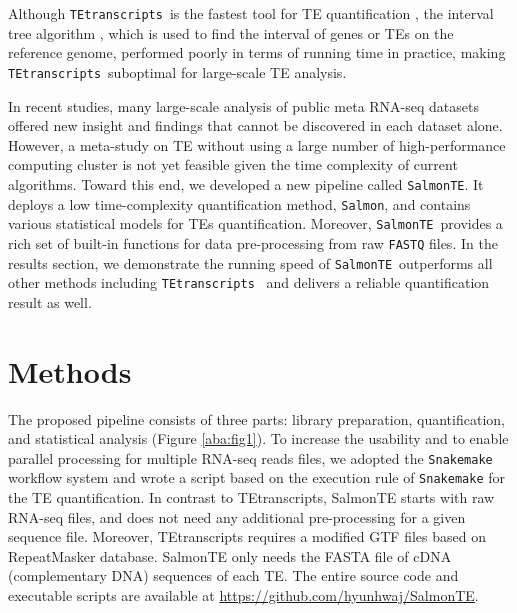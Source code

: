 \documentclass[wsdraft]{ws-procs11x85}
\newcommand{\TEtranscripts}{\texttt{TEtranscripts}}
\newcommand{\SalmonTE}{\texttt{SalmonTE}}
\begin{document}
Although \TEtranscripts~is the fastest tool for TE quantification \cite{jin2015tetranscripts}, the interval tree algorithm \cite{samet1990design}, which is used to find the interval of genes or TEs on the reference genome,  performed poorly in terms of running time in practice, making \TEtranscripts~suboptimal for large-scale TE analysis.

In recent studies,  many large-scale analysis of public meta RNA-seq datasets offered new insight and findings that cannot be discovered in each dataset alone. \cite{nellore2016human} However, a meta-study on TE without using a large number of high-performance computing cluster is not yet feasible given the time complexity of current algorithms.  Toward this end, we developed a new pipeline called \SalmonTE. It deploys a low time-complexity quantification method, \verb|Salmon|\cite{patro2017salmon}, and contains various statistical models for TEs quantification. Moreover, \SalmonTE~provides a rich set of built-in functions for data pre-processing from raw \verb|FASTQ| files. 
In the results section, we demonstrate the running speed of \SalmonTE~outperforms all other methods including \TEtranscripts~ and delivers a reliable quantification result as well.

\section{Methods}

The proposed pipeline consists of three parts: library preparation, quantification, and statistical analysis (Figure \ref{aba:fig1}). To increase the usability and to enable parallel processing for multiple RNA-seq reads files, we adopted the \texttt{Snakemake} workflow system and wrote a script based on the execution rule of \texttt{Snakemake} for the TE quantification.\cite{koster2012snakemake} In contrast to TEtranscripts, SalmonTE starts with raw RNA-seq files, and does not need any additional pre-processing for a given sequence file. Moreover, TEtranscripts requires a modified GTF files based on RepeatMasker database.\cite{RepeatMasker} SalmonTE only needs the FASTA file of cDNA (complementary DNA) sequences of each TE. The entire source code and executable scripts are available at \url{https://github.com/hyunhwaj/SalmonTE}.
\end{document}
